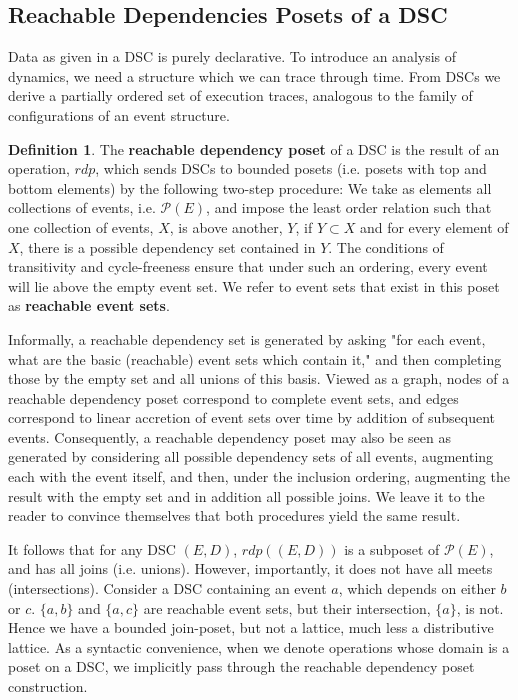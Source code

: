 \documentclass[hoptionsi,review,format=acmsmall]{acmart}
\theoremstyle{definition}
\newtheorem{definition}{Definition}[section]
\newcommand{\Pc}{\mathcal{P}}
\begin{document}
\subsection{Reachable Dependencies Posets of a DSC}

Data as given in a DSC is purely declarative. To introduce an analysis of dynamics, we need a structure which we can trace through time. From DSCs we derive a partially ordered set of execution traces, analogous to the family of configurations of an event structure.

\begin{definition} The \textbf{reachable dependency poset} of a DSC is the result of an operation, \(rdp\), which sends DSCs to bounded posets (i.e. posets with top and bottom elements) by the following two-step procedure:  We take as elements all collections of events, i.e. \(\Pc(E)\), and impose the least order relation such that one collection of events, \(X\), is above another, \(Y\), if \(Y \subset X\) and for every element of \(X\), there is a possible dependency set contained in \(Y\).  The conditions of transitivity and cycle-freeness ensure that under such an ordering, every event will lie above the empty event set. We refer to event sets that exist in this poset as \textbf{reachable event sets}.
\end{definition}

Informally, a reachable dependency set is generated by asking "for each event, what are the basic (reachable) event sets which contain it," and then completing those by the empty set and all unions of this basis. Viewed as a graph, nodes of a reachable dependency poset correspond to complete event sets, and edges correspond to linear accretion of event sets over time by addition of subsequent events. Consequently, a reachable dependency poset may also be seen as generated by considering all possible dependency sets of all events, augmenting each with the event itself, and then, under the inclusion ordering, augmenting the result with the empty set and in addition all possible joins. We leave it to the reader to convince themselves that both procedures yield the same result.

It follows that for any DSC \((E,D)\), \(rdp((E,D))\)  is a subposet of \(\Pc(E)\), and has all joins (i.e. unions). However, importantly, it does not have all meets (intersections). Consider a DSC containing an event \(a\), which depends on either \(b\) or \(c\). \(\{a,b\}\) and  \(\{a,c\}\) are reachable event sets, but their intersection, \(\{a\}\), is not. Hence we have a bounded join-poset, but not a lattice, much less a distributive lattice. As a syntactic convenience, when we denote operations whose domain is a poset on a DSC, we implicitly pass through the reachable dependency poset construction.
\end{document}

